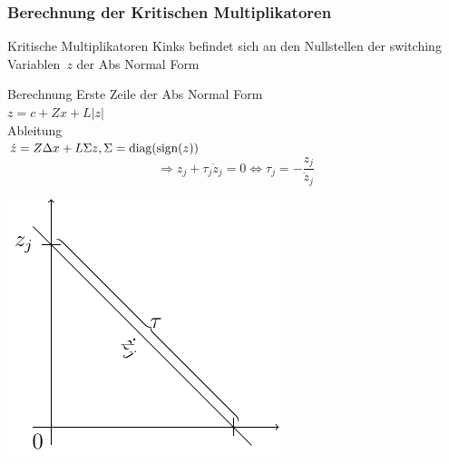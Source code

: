 \begin{frame}[<+->]
\frametitle{Berechnung der Kritischen Multiplikatoren}
\begin{minipage}{0.5\textwidth} 
	\begin{block}{Kritische Multiplikatoren}
	 \glqq Kinks befindet sich an den Nullstellen der switching Variablen~$z$ der Abs Normal Form \grqq
	\end{block}
	\begin{block}{Berechnung}
	   Erste Zeile der Abs Normal Form\\
	   $ z = c+ Zx+L|z|$\\
	    Ableitung\\
	   $\dot z = Z\Delta x+L\Sigma z, \Sigma = \operatorname{diag}(\operatorname{sign}(z))$
	    \[\Rightarrow z_j + \tau_j \dot z_j = 0 \iff \tau_j = -\frac{z_j}{\dot z_j}\]
	\end{block}
	\end{minipage}
	\hfill
	\begin{minipage}{0.4\textwidth}
	\includegraphics[width=\linewidth]{../dipl_tex/img/tikz/finding_kinks.pdf}	
	\end{minipage}
\end{frame}
